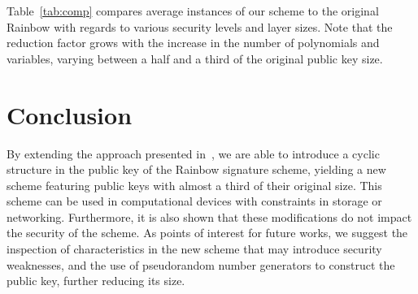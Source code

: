 \documentclass[a4paper, 14pt]{extarticle}
\begin{document}
Table~\ref{tab:comp} compares average instances of our scheme to the original Rainbow with regards to various security levels and layer sizes. Note that the reduction factor grows with the increase in the number of polynomials and variables, varying between a half and a third of the original public key size.

\section{Conclusion}\label{sec:conclusion}

By extending the approach presented in~\cite{Petzoldt:inproc:2010:jun}, we are able to introduce a cyclic structure in the public key of the Rainbow signature scheme, yielding a new scheme featuring public keys with almost a third of their original size. This scheme can be used in computational devices with constraints in storage or networking. Furthermore, it is also shown that these modifications do not impact the security of the scheme. As points of interest for future works, we suggest the inspection of characteristics in the new scheme that may introduce security weaknesses, and the use of pseudorandom number generators to construct the public key, further reducing its size.


{\footnotesize
}
\end{document}
